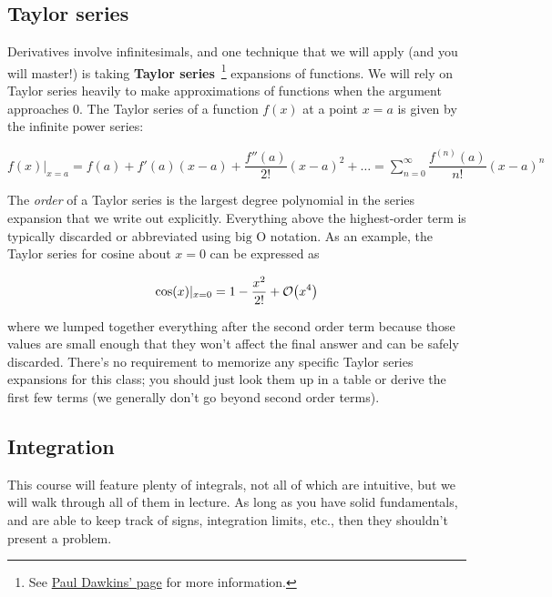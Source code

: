 \subsection{Taylor series}

Derivatives involve infinitesimals, and one technique that we will apply (and you will master!) is taking \textbf{Taylor series}~\footnote{See \href{http://tutorial.math.lamar.edu/Classes/CalcII/TaylorSeries.aspx}{Paul Dawkins' page} for more information.} expansions of functions. 
We will rely on Taylor series heavily to make approximations of functions when the argument approaches 0.  
The Taylor series of a function $f(x)$ at a point $x=a$ is given by the infinite power series:

\begin{tcolorbox}[title=Taylor series formula]
	$f(x)|_{x=a} = f(a) + f'(a)(x-a) + \dfrac{f''(a)}{2!}(x-a)^2 + \dots = \displaystyle\sum_{n=0}^{\infty} \dfrac{f^{(n)}(a)}{n!}(x-a)^n$
\end{tcolorbox}

The \emph{order} of a Taylor series is the largest degree polynomial in the series expansion that we write out explicitly. 
Everything above the highest-order term is typically discarded or abbreviated using $\text{big O}$ notation. 
As an example, the Taylor series for cosine about $x = 0$ can be expressed as 

\[ \cos(x)|_{x=0} = 1 - \dfrac{x^2}{2!} + \order{x^4} \] 

\noindent where we lumped together everything after the second order term because those values are small enough that they won't affect the final answer and can be safely discarded. 
There's no requirement to memorize any specific Taylor series expansions for this class; you should just look them up in a table or derive the first few terms (we generally don't go beyond second order terms).


\subsection{Integration} \label{sec:calculus-int}

This course will feature plenty of integrals, not all of which are intuitive, but we will walk through all of them in lecture. 
As long as you have solid fundamentals, and are able to keep track of signs, integration limits, etc., then they shouldn't present a problem.

